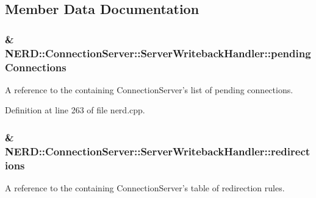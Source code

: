 \subsection{\-Member \-Data \-Documentation}
\hypertarget{classNERD_1_1ConnectionServer_1_1ServerWritebackHandler_ab13916995c4c8ed9debb0ebac0cca091}{
\subsubsection[{pending\-Connections}]{\& {\bf \-N\-E\-R\-D\-::\-Connection\-Server\-::\-Server\-Writeback\-Handler\-::pending\-Connections}}}
\label{classNERD_1_1ConnectionServer_1_1ServerWritebackHandler_ab13916995c4c8ed9debb0ebac0cca091}


\-A reference to the containing \-Connection\-Server's list of pending connections. 



\-Definition at line 263 of file nerd.\-cpp.

\hypertarget{classNERD_1_1ConnectionServer_1_1ServerWritebackHandler_a436b00e74f3cab280212aea4c4068838}{
\subsubsection[{redirections}]{\& {\bf \-N\-E\-R\-D\-::\-Connection\-Server\-::\-Server\-Writeback\-Handler\-::redirections}}}
\label{classNERD_1_1ConnectionServer_1_1ServerWritebackHandler_a436b00e74f3cab280212aea4c4068838}


\-A reference to the containing \-Connection\-Server's table of redirection rules. 



